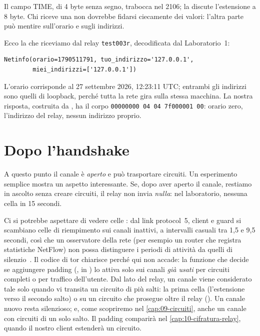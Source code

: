 Il campo TIME, di 4 byte senza segno, trabocca nel 2106; la  discute l'estensione a 8 byte. Chi riceve una  non dovrebbe fidarsi ciecamente dei valori: l'altra parte può mentire sull'orario e sugli indirizzi.

Ecco la  che riceviamo dal relay \texttt{test003r}, decodificata dal Laboratorio~1:
\begin{lstlisting}[numbers=none]
Netinfo(orario=1790511791, tuo_indirizzo='127.0.0.1',
        miei_indirizzi=['127.0.0.1'])
\end{lstlisting}
L'orario corrisponde al 27 settembre 2026, 12:23:11 UTC; entrambi gli indirizzi sono quelli di loopback, perché tutta la rete gira sulla stessa macchina. La nostra risposta, costruita da , ha il corpo \texttt{00000000 04 04 7f000001 00}: orario zero, l'indirizzo del relay, nessun indirizzo proprio.

\section{Dopo l'handshake}\label{sec:canale-dopo}

A questo punto il canale è \emph{aperto} e può trasportare circuiti. Un esperimento semplice mostra un aspetto interessante. Se, dopo aver aperto il canale, restiamo in ascolto senza creare circuiti, il relay non invia \emph{nulla}: nel laboratorio, nessuna cella in 15 secondi.

Ci si potrebbe aspettare di vedere celle : dal link protocol~5, client e guard si scambiano celle di riempimento sui canali inattivi, a intervalli casuali tra 1,5 e 9,5 secondi, così che un osservatore della rete (per esempio un router che registra statistiche NetFlow) non possa distinguere i periodi di attività da quelli di silenzio~. Il codice di tor chiarisce perché qui non accade: la funzione che decide se aggiungere padding (, in ) lo attiva solo sui canali \emph{già usati} per circuiti completi o per traffico dell'utente. Dal lato del relay, un canale viene considerato tale solo quando vi transita un circuito di più salti: la prima cella  (l'estensione verso il secondo salto) o  su un circuito che prosegue oltre il relay (). Un canale nuovo resta silenzioso; e, come scopriremo nel \cref{cap:09-circuiti}, anche un canale con circuiti di un solo salto. Il padding comparirà nel \cref{cap:10-cifratura-relay}, quando il nostro client estenderà un circuito.

